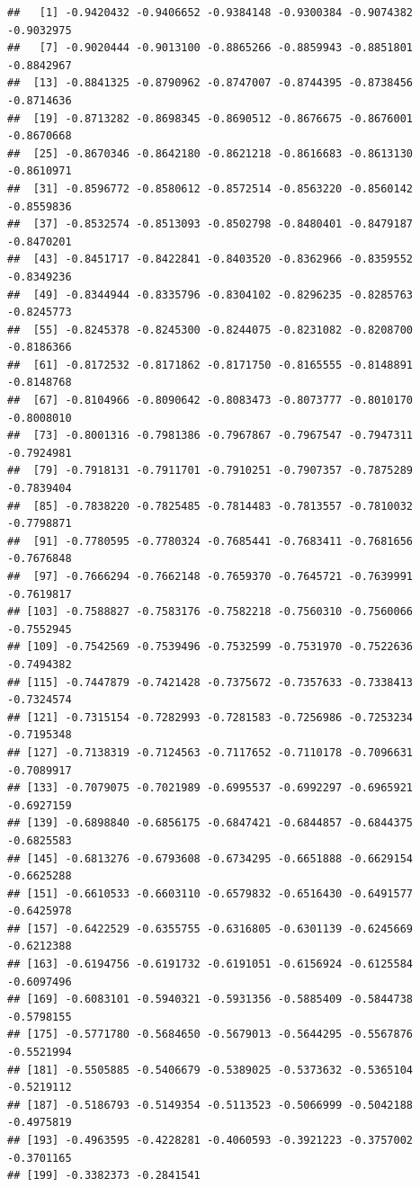 \documentclass[11pt]{exam}
\begin{document}
\begin{questions}
{\begin{verbatim}
##   [1] -0.9420432 -0.9406652 -0.9384148 -0.9300384 -0.9074382 -0.9032975
##   [7] -0.9020444 -0.9013100 -0.8865266 -0.8859943 -0.8851801 -0.8842967
##  [13] -0.8841325 -0.8790962 -0.8747007 -0.8744395 -0.8738456 -0.8714636
##  [19] -0.8713282 -0.8698345 -0.8690512 -0.8676675 -0.8676001 -0.8670668
##  [25] -0.8670346 -0.8642180 -0.8621218 -0.8616683 -0.8613130 -0.8610971
##  [31] -0.8596772 -0.8580612 -0.8572514 -0.8563220 -0.8560142 -0.8559836
##  [37] -0.8532574 -0.8513093 -0.8502798 -0.8480401 -0.8479187 -0.8470201
##  [43] -0.8451717 -0.8422841 -0.8403520 -0.8362966 -0.8359552 -0.8349236
##  [49] -0.8344944 -0.8335796 -0.8304102 -0.8296235 -0.8285763 -0.8245773
##  [55] -0.8245378 -0.8245300 -0.8244075 -0.8231082 -0.8208700 -0.8186366
##  [61] -0.8172532 -0.8171862 -0.8171750 -0.8165555 -0.8148891 -0.8148768
##  [67] -0.8104966 -0.8090642 -0.8083473 -0.8073777 -0.8010170 -0.8008010
##  [73] -0.8001316 -0.7981386 -0.7967867 -0.7967547 -0.7947311 -0.7924981
##  [79] -0.7918131 -0.7911701 -0.7910251 -0.7907357 -0.7875289 -0.7839404
##  [85] -0.7838220 -0.7825485 -0.7814483 -0.7813557 -0.7810032 -0.7798871
##  [91] -0.7780595 -0.7780324 -0.7685441 -0.7683411 -0.7681656 -0.7676848
##  [97] -0.7666294 -0.7662148 -0.7659370 -0.7645721 -0.7639991 -0.7619817
## [103] -0.7588827 -0.7583176 -0.7582218 -0.7560310 -0.7560066 -0.7552945
## [109] -0.7542569 -0.7539496 -0.7532599 -0.7531970 -0.7522636 -0.7494382
## [115] -0.7447879 -0.7421428 -0.7375672 -0.7357633 -0.7338413 -0.7324574
## [121] -0.7315154 -0.7282993 -0.7281583 -0.7256986 -0.7253234 -0.7195348
## [127] -0.7138319 -0.7124563 -0.7117652 -0.7110178 -0.7096631 -0.7089917
## [133] -0.7079075 -0.7021989 -0.6995537 -0.6992297 -0.6965921 -0.6927159
## [139] -0.6898840 -0.6856175 -0.6847421 -0.6844857 -0.6844375 -0.6825583
## [145] -0.6813276 -0.6793608 -0.6734295 -0.6651888 -0.6629154 -0.6625288
## [151] -0.6610533 -0.6603110 -0.6579832 -0.6516430 -0.6491577 -0.6425978
## [157] -0.6422529 -0.6355755 -0.6316805 -0.6301139 -0.6245669 -0.6212388
## [163] -0.6194756 -0.6191732 -0.6191051 -0.6156924 -0.6125584 -0.6097496
## [169] -0.6083101 -0.5940321 -0.5931356 -0.5885409 -0.5844738 -0.5798155
## [175] -0.5771780 -0.5684650 -0.5679013 -0.5644295 -0.5567876 -0.5521994
## [181] -0.5505885 -0.5406679 -0.5389025 -0.5373632 -0.5365104 -0.5219112
## [187] -0.5186793 -0.5149354 -0.5113523 -0.5066999 -0.5042188 -0.4975819
## [193] -0.4963595 -0.4228281 -0.4060593 -0.3921223 -0.3757002 -0.3701165
## [199] -0.3382373 -0.2841541
\end{verbatim}
}


\end{questions}
\end{document}
